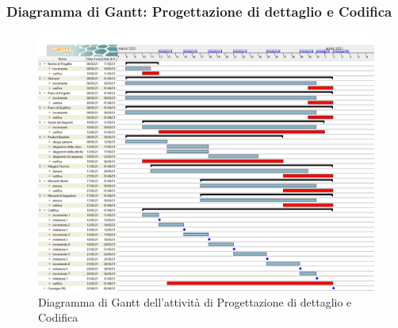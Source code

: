 \subsubsection{Diagramma di Gantt: Progettazione di dettaglio e Codifica}
\begin{figure}
	\includegraphics[scale=0.35]{Images/GanttPianificazioneProgettazioneDettaglioCodifica.png}
	\caption{Diagramma di Gantt dell'attività di Progettazione di dettaglio e Codifica}
\end{figure}
